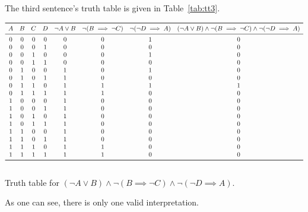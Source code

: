 \documentclass[journal,onecolumn]{IEEEtran}
\begin{document}
\begin{enumerate}
	The third sentence's truth table is given in Table~\ref{tab:tt3}.
	\begin{table}[H]
		\centering
		\(
		\begin{array}{cccc@{\quad}cccc}
		\toprule
		A & B & C & D & \lnot A \lor B & \lnot(B \implies \lnot C) & \lnot(\lnot D \implies A) & (\lnot A \lor B) \land \lnot(B \implies \lnot C) \land \lnot(\lnot D \implies A)\\
		\midrule
		0 & 0 & 0 & 0 & 0 & 0 & 1 & 0 \\
		0 & 0 & 0 & 1 & 0 & 0 & 0 & 0 \\
		0 & 0 & 1 & 0 & 0 & 0 & 1 & 0 \\
		0 & 0 & 1 & 1 & 0 & 0 & 0 & 0 \\
		0 & 1 & 0 & 0 & 1 & 0 & 1 & 0 \\
		0 & 1 & 0 & 1 & 1 & 0 & 0 & 0 \\
		0 & 1 & 1 & 0 & 1 & 1 & 1 & 1 \\
		0 & 1 & 1 & 1 & 1 & 1 & 0 & 0 \\
		1 & 0 & 0 & 0 & 1 & 0 & 0 & 0 \\
		1 & 0 & 0 & 1 & 1 & 0 & 0 & 0 \\
		1 & 0 & 1 & 0 & 1 & 0 & 0 & 0 \\
		1 & 0 & 1 & 1 & 1 & 0 & 0 & 0 \\
		1 & 1 & 0 & 0 & 1 & 0 & 0 & 0 \\
		1 & 1 & 0 & 1 & 1 & 0 & 0 & 0 \\
		1 & 1 & 1 & 0 & 1 & 1 & 0 & 0 \\
		1 & 1 & 1 & 1 & 1 & 1 & 0 & 0 \\
		\bottomrule\\
		\end{array}
		\)
		\caption{Truth table for \((\lnot A \lor B) \land \lnot(B \implies \lnot C) \land \lnot(\lnot D \implies A)\).}
		\label{tab:tt3}
	\end{table}
	As one can see, there is only one valid interpretation.
\end{enumerate}
\end{document}
